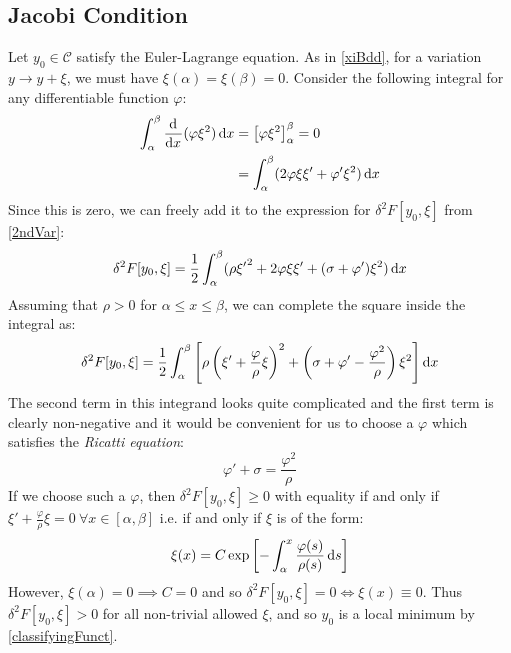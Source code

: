 \documentclass[../main.tex]{subfiles}
\begin{document}
\subsection{Jacobi Condition}
Let $y_0 \in \mathscr{C}$ satisfy the Euler-Lagrange equation.
As in \cref{xiBdd}, for a variation $y \to y + \xi$, we must have $\xi(\alpha) = \xi(\beta) = 0$.
Consider the following integral for any differentiable function $\varphi$:
\begin{align*}
  \int_{\alpha }^{\beta} \deriv{}{x}(\varphi \xi^2) \d{x} &= \eval{\varphi \xi^2}{\alpha}{\beta} = 0 \\
                                                &= \int_{\alpha}^{\beta} (2 \varphi \xi \xi' + \varphi' \xi^2) \d{x}
\end{align*}
Since this is zero, we can freely add it to the expression for $\delta^2 F[y_0, \xi]$ from \cref{2ndVar}:
\[
  \delta^2 F[y_0, \xi] = \frac{1}{2} \int_{\alpha}^{\beta} (\rho {\xi'}^2 + 2 \varphi \xi \xi' + (\sigma + \varphi')\xi^2) \d{x}
\]
Assuming that $\rho > 0$ for $\alpha \leq x \leq \beta$, we can complete the square inside the integral as:
\[
  \delta^2 F[y_0, \xi] = \frac{1}{2} \int_{\alpha}^{\beta} \left[\rho\left(\xi' + \frac{\varphi}{\rho}\xi\right)^2 + \left(\sigma + \varphi' - \frac{\varphi^2}{\rho}\right)\xi^2\right] \d{x}
\]
The second term in this integrand looks quite complicated and the first term is clearly non-negative and it would be convenient for us to choose a $\varphi$ which satisfies the \textit{Ricatti equation}:
\begin{equation}
  \varphi' + \sigma = \frac{\varphi^2}{\rho} \label{ricatti}
\end{equation}
If we choose such a $\varphi$, then $\delta^2 F[y_0, \xi] \geq 0$ with equality if and only if $\xi' + \frac{\varphi}{\rho}\xi = 0\ \forall x \in [\alpha, \beta]$ i.e. if and only if $\xi$ is of the form:
\[
  \xi(x) = C \exp\left[-\int_{\alpha}^{x} \frac{\varphi(s)}{\rho(s)} \d{s}\right]
\]
However, $\xi(\alpha) = 0 \implies C = 0$ and so $\delta^2 F[y_0, \xi] = 0 \iff \xi(x) \equiv 0$.
Thus $\delta^2 F[y_0, \xi] > 0$ for all non-trivial allowed $\xi$, and so $y_0$ is a local minimum by \cref{classifyingFunct}.
\end{document}
